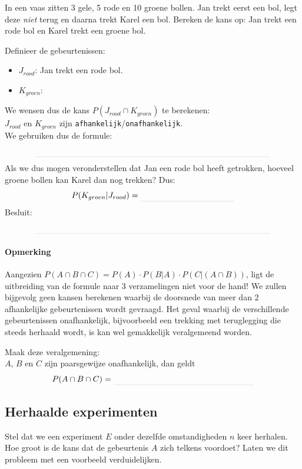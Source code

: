 \documentclass[12pt,twoside]{article}
\begin{document}
\begin{oefening}
In een vaas zitten 3 gele, 5 rode en 10 groene bollen. Jan trekt eerst een bol, legt deze {\em niet} terug en daarna trekt Karel een bol. Bereken de kans op: Jan trekt een rode bol en Karel trekt een groene bol.

Definieer de gebeurtenissen:
\begin{itemize}
  \itemsep0.1em
  \item $J_{rood}$: Jan trekt een rode bol.
  \item $K_{groen}$: \arulefill
\end{itemize}
\vspace*{0.5cm}
We wensen dus de kans $P(J_{rood}\cap K_{groen})$ te berekenen:\\
$J_{rood}$ en $K_{groen}$ zijn \verb#afhankelijk#/\verb#onafhankelijk#.\\
We gebruiken dus de formule:
$$\arule{10cm}$$
Als we dus mogen veronderstellen dat Jan een rode bol heeft getrokken, hoeveel groene bollen kan Karel dan nog trekken? \arule{2cm}
Dus:
$$P(K_{groen}|J_{rood})=\arule{4cm}$$
Besluit:
$$\arule{10cm}$$
\end{oefening}

\paragraph*{Opmerking}

Aangezien $P(A\cap B\cap C)=P(A)\cdot P(B|A) \cdot P(C|(A\cap B))$, ligt de uitbreiding van de formule naar 3 verzamelingen niet voor de hand! We zullen bijgevolg geen kansen berekenen waarbij de doorsnede van meer dan 2 afhankelijke gebeurtenissen wordt gevraagd. Het geval waarbij de verschillende gebeurtenissen onafhankelijk, bijvoorbeeld een trekking met teruglegging die steeds herhaald wordt, is kan wel gemakkelijk veralgemeend worden.

\begin{oefening}
Maak deze veralgemening:\\
$A$, $B$ en $C$ zijn paarsgewijze onafhankelijk, dan geldt $$P(A\cap B\cap C)=\arule{6cm}$$
\end{oefening}

\subsection{Herhaalde experimenten}

Stel dat we een experiment $E$ onder dezelfde omstandigheden $n$ keer herhalen. Hoe groot is de kans dat de gebeurtenis $A$ zich telkens voordoet?
Laten we dit probleem met een voorbeeld verduidelijken.
\end{document}
